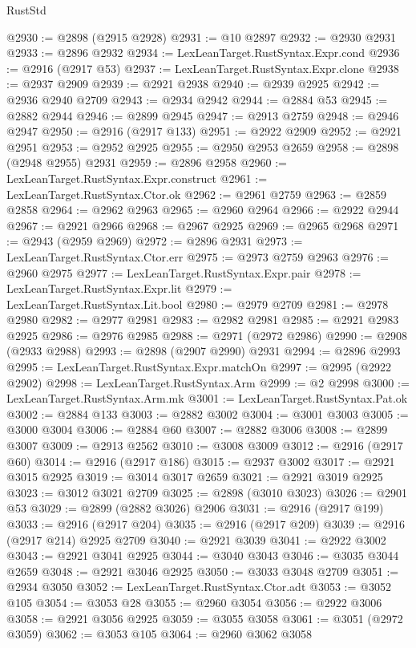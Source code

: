 \begin{lexlean}{RustStd}
\begin{coremodule}
@2930 := @2898 (@2915 @2928)
@2931 := @10 @2897
@2932 := @2930 @2931
@2933 := @2896 @2932
@2934 := LexLeanTarget.RustSyntax.Expr.cond
@2936 := @2916 (@2917 @53)
@2937 := LexLeanTarget.RustSyntax.Expr.clone
@2938 := @2937 @2909
@2939 := @2921 @2938
@2940 := @2939 @2925
@2942 := @2936 @2940 @2709
@2943 := @2934 @2942
@2944 := @2884 @53
@2945 := @2882 @2944
@2946 := @2899 @2945
@2947 := @2913 @2759
@2948 := @2946 @2947
@2950 := @2916 (@2917 @133)
@2951 := @2922 @2909
@2952 := @2921 @2951
@2953 := @2952 @2925
@2955 := @2950 @2953 @2659
@2958 := @2898 (@2948 @2955) @2931
@2959 := @2896 @2958
@2960 := LexLeanTarget.RustSyntax.Expr.construct
@2961 := LexLeanTarget.RustSyntax.Ctor.ok
@2962 := @2961 @2759
@2963 := @2859 @2858
@2964 := @2962 @2963
@2965 := @2960 @2964
@2966 := @2922 @2944
@2967 := @2921 @2966
@2968 := @2967 @2925
@2969 := @2965 @2968
@2971 := @2943 (@2959 @2969)
@2972 := @2896 @2931
@2973 := LexLeanTarget.RustSyntax.Ctor.err
@2975 := @2973 @2759 @2963
@2976 := @2960 @2975
@2977 := LexLeanTarget.RustSyntax.Expr.pair
@2978 := LexLeanTarget.RustSyntax.Expr.lit
@2979 := LexLeanTarget.RustSyntax.Lit.bool
@2980 := @2979 @2709
@2981 := @2978 @2980
@2982 := @2977 @2981
@2983 := @2982 @2981
@2985 := @2921 @2983 @2925
@2986 := @2976 @2985
@2988 := @2971 (@2972 @2986)
@2990 := @2908 (@2933 @2988)
@2993 := @2898 (@2907 @2990) @2931
@2994 := @2896 @2993
@2995 := LexLeanTarget.RustSyntax.Expr.matchOn
@2997 := @2995 (@2922 @2902)
@2998 := LexLeanTarget.RustSyntax.Arm
@2999 := @2 @2998
@3000 := LexLeanTarget.RustSyntax.Arm.mk
@3001 := LexLeanTarget.RustSyntax.Pat.ok
@3002 := @2884 @133
@3003 := @2882 @3002
@3004 := @3001 @3003
@3005 := @3000 @3004
@3006 := @2884 @60
@3007 := @2882 @3006
@3008 := @2899 @3007
@3009 := @2913 @2562
@3010 := @3008 @3009
@3012 := @2916 (@2917 @60)
@3014 := @2916 (@2917 @186)
@3015 := @2937 @3002
@3017 := @2921 @3015 @2925
@3019 := @3014 @3017 @2659
@3021 := @2921 @3019 @2925
@3023 := @3012 @3021 @2709
@3025 := @2898 (@3010 @3023)
@3026 := @2901 @53
@3029 := @2899 (@2882 @3026) @2906
@3031 := @2916 (@2917 @199)
@3033 := @2916 (@2917 @204)
@3035 := @2916 (@2917 @209)
@3039 := @2916 (@2917 @214) @2925 @2709
@3040 := @2921 @3039
@3041 := @2922 @3002
@3043 := @2921 @3041 @2925
@3044 := @3040 @3043
@3046 := @3035 @3044 @2659
@3048 := @2921 @3046 @2925
@3050 := @3033 @3048 @2709
@3051 := @2934 @3050
@3052 := LexLeanTarget.RustSyntax.Ctor.adt
@3053 := @3052 @105
@3054 := @3053 @28
@3055 := @2960 @3054
@3056 := @2922 @3006
@3058 := @2921 @3056 @2925
@3059 := @3055 @3058
@3061 := @3051 (@2972 @3059)
@3062 := @3053 @105
@3064 := @2960 @3062 @3058

\end{coremodule}
\end{lexlean}
